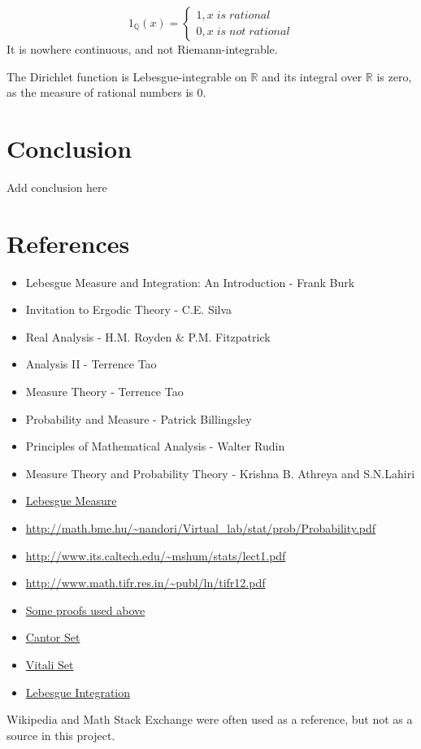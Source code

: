 \documentclass{article}
\begin{document}
\[ 1_{\mathbb{Q}}(x)=\begin{cases} 
    1 , x \;is\; rational \\
    0 , x \;is\; not\; rational
   \end{cases}
\]
 It is nowhere continuous, and not Riemann-integrable.\medskip
 
 The Dirichlet function is Lebesgue-integrable on $\mathbb{R}$ and its integral over $\mathbb{R}$ is zero, as the measure of rational numbers is 0.



\newpage
\section{Conclusion}
	Add conclusion here
\newpage
\section{References}
\begin{itemize}
    \item Lebesgue Measure and Integration: An Introduction - Frank Burk
    \item Invitation to Ergodic Theory - C.E. Silva
    \item Real Analysis - H.M. Royden \& P.M. Fitzpatrick
    \item Analysis II - Terrence Tao
    \item Measure Theory - Terrence Tao
    \item Probability and Measure - Patrick Billingsley
    \item Principles of Mathematical Analysis - Walter Rudin
    \item Measure Theory and Probability Theory - Krishna B. Athreya and S.N.Lahiri
    \item \href{https://en.wikipedia.org/wiki/Lebesgue_measure}{Lebesgue Measure}
    \item \url{http://math.bme.hu/~nandori/Virtual_lab/stat/prob/Probability.pdf}
    \item \url{http://www.its.caltech.edu/~mshum/stats/lect1.pdf}
    \item \url{http://www.math.tifr.res.in/~publ/ln/tifr12.pdf}
    \item \href{https://faculty.etsu.edu/gardnerr/5210/Beamer-Proofs/Proofs-2-2.pdf}{Some proofs used above}
    \item \href{https://en.wikipedia.org/wiki/Cantor_set}{Cantor Set}
    \item \href{https://en.wikipedia.org/wiki/Vitali_set}{Vitali Set}
    \item \href{https://en.wikipedia.org/wiki/Lebesgue_integration}{Lebesgue Integration}
    
\end{itemize}
Wikipedia and Math Stack Exchange were often used  as a reference, but not as a source in this project.
\end{document}

